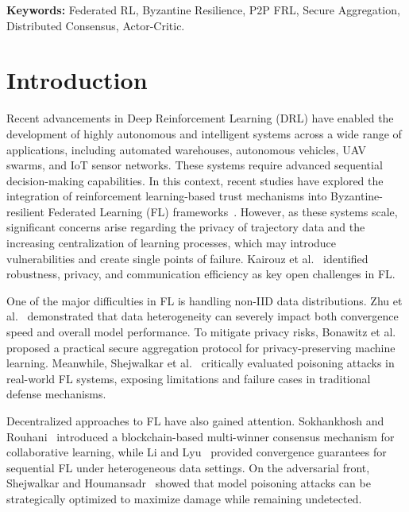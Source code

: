 \documentclass[12pt,a4paper]{article}
\begin{document}
\noindent\textbf{Keywords:} Federated RL, Byzantine Resilience, P2P FRL, Secure
Aggregation, Distributed Consensus, Actor-Critic.

\setcounter{section}{1}
\section{Introduction}
\label{sec:intro}

Recent advancements in Deep Reinforcement Learning (DRL) have enabled the development
of highly autonomous and intelligent systems across a wide range of applications,
including automated warehouses, autonomous vehicles, UAV swarms, and IoT sensor
networks. These systems require advanced sequential decision-making capabilities. In
this context, recent studies have explored the integration of reinforcement
learning-based trust mechanisms into Byzantine-resilient Federated Learning (FL)
frameworks~\cite{ref1}. However, as these systems scale, significant concerns arise
regarding the privacy of trajectory data and the increasing centralization of learning
processes, which may introduce vulnerabilities and create single points of failure.
Kairouz et al.~\cite{ref2} identified robustness, privacy, and communication efficiency
as key open challenges in FL.

One of the major difficulties in FL is handling non-IID data distributions.
Zhu et al.~\cite{ref3} demonstrated that data heterogeneity can severely impact both
convergence speed and overall model performance. To mitigate privacy risks, Bonawitz
et al.~\cite{ref4} proposed a practical secure aggregation protocol for
privacy-preserving machine learning. Meanwhile, Shejwalkar et al.~\cite{ref5}
critically evaluated poisoning attacks in real-world FL systems, exposing limitations
and failure cases in traditional defense mechanisms.

Decentralized approaches to FL have also gained attention. Sokhankhosh and
Rouhani~\cite{ref6} introduced a blockchain-based multi-winner consensus mechanism for
collaborative learning, while Li and Lyu~\cite{ref7} provided convergence guarantees
for sequential FL under heterogeneous data settings. On the adversarial front,
Shejwalkar and Houmansadr~\cite{ref8} showed that model poisoning attacks can be
strategically optimized to maximize damage while remaining undetected.
\end{document}
